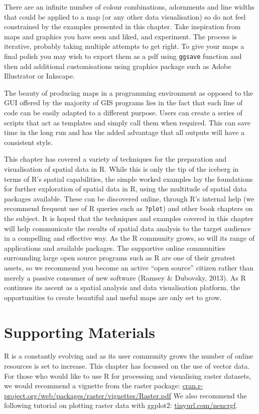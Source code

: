 \documentclass[]{article}
\begin{document}
There are an infinite number of colour combinations,
adornments and line widths that could be applied to a map (or any other
data visualisation) so do not feel constrained by the examples presented
in this chapter. Take inspiration from maps and graphics you have seen
and liked, and experiment. The process is iterative, probably taking
multiple attempts to get right. To give your
maps a final polish you may wish to export them as a pdf using
\texttt{ggsave} function and then add additional customisations using
graphics package such as Adobe Illustrator or Inkscape.

The beauty of producing maps in a programming environment as opposed to
the GUI offered by the majority of GIS programs lies in the fact that
each line of code can be easily adapted to a different purpose. Users
can create a series of scripts that act as templates and simply call
them when required. This can save time in the long run and has the added
advantage that all outputs will have a consistent style.

This chapter has covered a variety of techniques for the preparation and
visualisation of spatial data in R. While this is only the tip of the
iceberg in terms of R's spatial capabilities, the simple worked examples
lay the foundations for further exploration of spatial data in R, using
the multitude of spatial data packages available. These can be
discovered online, through R's internal help (we recommend frequent use
of R queries such as \texttt{?plot}) and other book chapters on the
subject. It is hoped that the techniques and examples covered in this
chapter will help communicate the results of spatial data analysis to
the target audience in a compelling and effective way. As the R community grows, so will its range of
applications and available packages. The supportive online communities
surrounding large open source programs such as R are one of their
greatest assets, so we recommend you become an active ``open source''
citizen rather than merely a passive consumer of new software (Ramsey \&
Dubovsky, 2013). As R continues its ascent as a spatial analysis and
data visualisation platform, the opportunities
to create beautiful and useful maps are only set to grow.

\section{Supporting Materials}

R is a constantly evolving and as its user community grows the number of online resources is set to increase. 
This chapter has focussed on the use of vector data. For those who would like to use R for processing and visualising raster datasets,
we would recommend a vignette from the raster package:
\href{http://cran.r-project.org/web/packages/raster/vignettes/Raster.pdf}{cran.r-project.org/web/packages/raster/vignettes/Raster.pdf}
We also recommend the following tutorial on plotting raster data with ggplot2:
\href{http://nrelscience.org/2013/05/30/this-is-how-i-did-it-mapping-in-r-with-ggplot2/}{tinyurl.com/nencrgf}.
\end{document}
